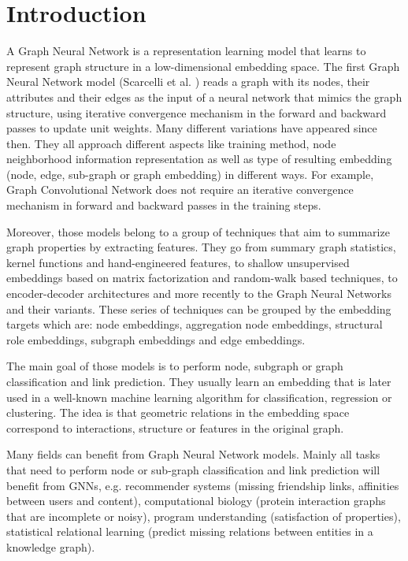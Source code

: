 \documentclass[a4paper]{article}
\begin{document}
\section{Introduction}

A Graph Neural Network is a representation learning model that learns to represent graph structure in a low-dimensional embedding space. The first Graph Neural Network model (Scarcelli et al. \cite{Scarselli}) reads a graph with its nodes, their attributes and their edges as the input of a neural network that mimics the graph structure, using iterative convergence mechanism in the forward and backward passes to update unit weights. 
Many different variations have appeared since then. They all approach different aspects like training method, node neighborhood information representation as well as type of resulting embedding (node, edge, sub-graph or graph embedding) in different ways. For example, Graph Convolutional Network does not require an iterative convergence mechanism in forward and backward passes in the training steps. 

Moreover, those models belong to a group of techniques that aim to summarize graph properties by extracting features. They go from summary graph statistics, kernel functions and hand-engineered features, to shallow unsupervised embeddings based on matrix factorization and random-walk based techniques, to encoder-decoder architectures and more recently to the Graph Neural Networks and their variants. These series of techniques can be grouped by the embedding targets which are: node embeddings, aggregation node embeddings, structural role embeddings, subgraph embeddings and edge embeddings.

The main goal of those models is to perform node, subgraph or graph classification and link prediction. They usually learn an embedding that is later used in a well-known machine learning algorithm for classification, regression or clustering. The idea is that geometric relations in the embedding space correspond to interactions, structure or features in the original graph.

Many fields can benefit from Graph Neural Network models. Mainly all tasks that need to perform node or sub-graph classification and link prediction will benefit from GNNs, e.g. recommender systems (missing friendship links, affinities between users and content), computational biology (protein interaction graphs that are incomplete or noisy), program understanding (satisfaction of properties), statistical relational learning (predict missing relations between entities in a knowledge graph).
\end{document}
